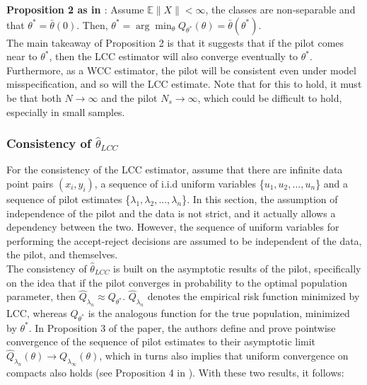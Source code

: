 \textbf{Proposition 2 as in \textcite{hastie2014}}: Assume $\mathbb{E}\|X\|<\infty$, the classes are non-separable and that $\theta^* = \bar{\theta}(0)$. Then, $\theta^*=\arg \min _\theta Q_{\theta^*}(\theta)=\bar{\theta}\left(\theta^*\right)$.\\

The main takeaway of Proposition 2 is that it suggests that if the pilot comes near to $\theta^*$, then the LCC estimator will also converge eventually to $\theta^*$. Furthermore, as a WCC estimator, the pilot will be consistent even under model misspecification, and so will the LCC estimate. Note that for this to hold, it must be that both $N \rightarrow \infty$ and the pilot $N_s \rightarrow \infty$, which could be difficult to hold, especially in small samples. 

\subsubsection{Consistency of $\hat{\theta}_{LCC}$}

For the consistency of the LCC estimator, assume that there are infinite data point pairs $(x_i, y_i)$, a sequence of i.i.d uniform variables \{$u_1, u_2, ..., u_n$\} and a sequence of pilot estimates \{$\lambda_1, \lambda_2, ..., \lambda_n$\}. In this section, the assumption of independence of the pilot and the data is not strict, and it actually allows a dependency between the two. However, the sequence of uniform variables for performing the accept-reject decisions are assumed to be independent of the data, the pilot, and themselves. \\

The consistency of $\hat{\theta}_{LCC}$ is built on the asymptotic results of the pilot, specifically on the idea that if the pilot converges in probability to the optimal population parameter, then $\widehat{Q}_{\lambda_n} \approx Q_{\theta^*}$. $\widehat{Q}_{\lambda_n}$ denotes the empirical risk function minimized by LCC, whereas $Q_{\theta^*}$ is the analogous function for the true population, minimized by $\theta^*$. In Proposition 3 of the paper, the authors define and prove pointwise convergence of the sequence of pilot estimates to their asymptotic limit $\widehat{Q}_{\lambda_n}(\theta) \rightarrow Q_{\lambda_{\infty}}(\theta)$, which in turns also implies that uniform convergence on compacts also holds (see Proposition 4 in \textcite{hastie2014}). With these two results, it follows:\\

